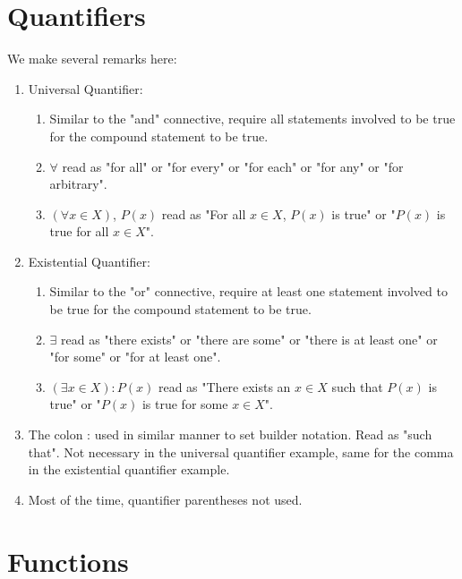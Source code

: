\section{Quantifiers}
\begin{remark}
    We make several remarks here:

    \begin{enumerate}
        \item Universal Quantifier:
        \begin{enumerate}[label=(\alph*)]
            \item Similar to the "and" connective, require all statements involved to be true for the compound statement to be true.
            \item $\forall$ read as "for all" or "for every" or "for each" or "for any" or "for arbitrary". 
            \item $(\forall x \in X)$, $P(x)$ read as "For all $x \in X$, $P(x)$ is true" or "$P(x)$ is true for all $x \in X$".
        \end{enumerate}
        \item Existential Quantifier:
        \begin{enumerate}[label=(\alph*)]
            \item Similar to the "or" connective, require at least one statement involved to be true for the compound statement to be true.
            \item $\exists$ read as "there exists" or "there are some" or "there is at least one" or "for some" or "for at least one".
            \item $(\exists x \in X): P(x)$ read as "There exists an $x \in X$ such that $P(x)$ is true" or "$P(x)$ is true for some $x \in X$".
        \end{enumerate}
        \item The colon : used in similar manner to set builder notation. Read as "such that". Not necessary in the universal quantifier example, same for the comma in the existential quantifier example.
        \item Most of the time, quantifier parentheses not used. 
    \end{enumerate}
\end{remark}




\section{Functions}
















